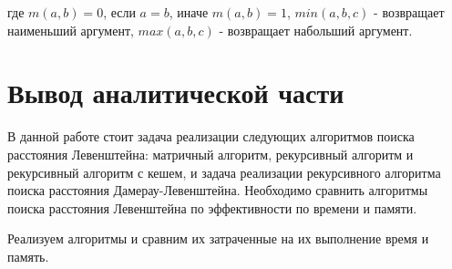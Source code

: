 где $m(a,b) = 0$, если $a=b$, иначе $m(a,b) = 1$, $min(a,b,c)$ - возвращает наименьший аргумент, 
$max(a,b,c)$ - возвращает набольший аргумент.


\section{Вывод аналитической части}\label{End_analis_chapter}

В данной работе стоит задача реализации следующих алгоритмов поиска расстояния Левенштейна: матричный алгоритм, рекурсивный алгоритм и 
рекурсивный алгоритм с кешем, и задача реализации рекурсивного алгоритма поиска расстояния Дамерау-Левенштейна. Необходимо сравнить 
алгоритмы поиска расстояния Левенштейна по эффективности по времени и памяти.

Реализуем алгоритмы и сравним их затраченные на их выполнение время и память.
 

